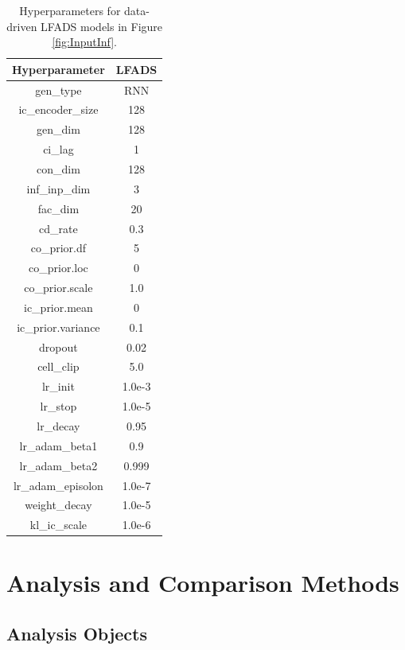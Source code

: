 \documentclass{article}
\begin{document}
\begin{table}[ht]
\centering
\begin{tabular}{|c|c|}
\hline
\textbf{Hyperparameter} & \textbf{LFADS} \\ \hline
gen\_type & RNN \\ \hline
ic\_encoder\_size & 128  \\ \hline
gen\_dim & 128 \\ \hline
ci\_lag & 1 \\ \hline
con\_dim & 128 \\ \hline
inf\_inp\_dim & 3 \\ \hline
fac\_dim & 20 \\ \hline
cd\_rate & 0.3 \\ \hline
co\_prior.df & 5 \\ \hline
co\_prior.loc & 0 \\ \hline
co\_prior.scale & 1.0 \\ \hline
ic\_prior.mean & 0 \\ \hline
ic\_prior.variance & 0.1 \\ \hline
dropout & 0.02 \\ \hline
cell\_clip & 5.0 \\ \hline
lr\_init & 1.0e-3 \\ \hline
lr\_stop & 1.0e-5 \\ \hline
lr\_decay & 0.95 \\ \hline
lr\_adam\_beta1 & 0.9 \\ \hline
lr\_adam\_beta2 & 0.999 \\ \hline
lr\_adam\_episolon & 1.0e-7 \\ \hline
weight\_decay & 1.0e-5 \\ \hline
kl\_ic\_scale & 1.0e-6 \\ \hline
\end{tabular}
\caption{Hyperparameters for data-driven LFADS models in Figure \ref{fig:InputInf}.}
\label{table:DDLFADSInputInf}
\end{table}

\clearpage

\section{Analysis and Comparison Methods \label{appendix:ComparisonMethods}}

\subsection{Analysis Objects}
\end{document}
